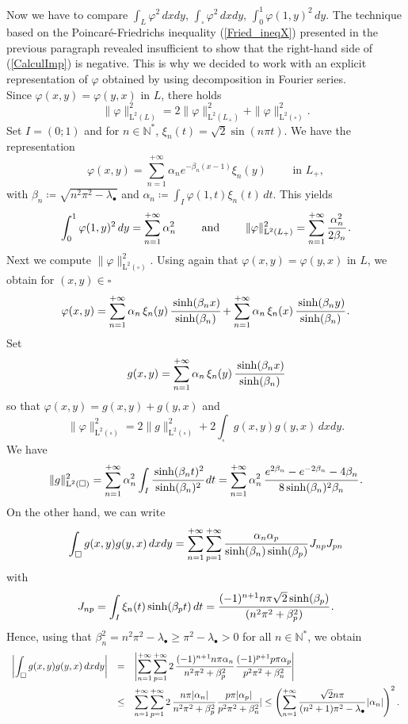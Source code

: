 \documentclass[11pt,a4paper]{article}
\newcommand{\dsp}{\displaystyle}
\newcommand{\mrm}[1]{\mathrm{#1}}
\newcommand{\N}{\mathbb{N}}
\newcommand{\mL}{\mrm{L}}
\newcommand{\GL}{L}
\begin{document}
Now we have to compare $\int_\GL\varphi^2\,dxdy$, $\int_{\square}\varphi^2\,dxdy$, $\int_0^1\varphi(1,y)^2\,dy$. The technique based on the Poincar\'e-Friedrichs inequality (\ref{Fried_ineqX}) presented in the previous paragraph revealed insufficient to show that the right-hand side of (\ref{CalculImp}) is negative. This is why we decided to work with an explicit representation of $\varphi$ obtained by using decomposition in Fourier series.\\
\newline
Since $\varphi(x,y)=\varphi(y,x)$ in $\GL$, there holds 
\begin{equation}\label{DecompoTermL2}
\|\varphi\|^2_{\mL^2(\GL)}=2\|\varphi\|^2_{\mL^2(\GL_+)}+\|\varphi\|^2_{\mL^2(\square)}.
\end{equation}
Set $I=(0;1)$ and for $n\in\N^\ast$, $\xi_n(t)=\sqrt{2}\sin(n\pi t)$. We have the representation
\[
\varphi(x,y)=\sum_{n=1}^{+\infty} \alpha_n e^{-\beta_n(x-1)}\xi_n(y)\qquad\mbox{ in }\GL_+, 
\] 
with $\beta_n\coloneqq\sqrt{n^2\pi^2-\lambda_\bullet}$ and $\alpha_n\coloneqq\int_I \varphi(1,t)\xi_n(t)\,dt$. This yields 
\[
\int_0^1\varphi(1,y)^2\,dy=\sum_{n=1}^{+\infty} \alpha^2_n \qquad\mbox{ and }\qquad \|\varphi\|^2_{\mL^2(\GL_+)} = \sum_{n=1}^{+\infty} \cfrac{\alpha^2_n }{2\beta_n}\,.
\]
Next we compute $\|\varphi\|^2_{\mL^2(\square)}$. Using again that $\varphi(x,y)=\varphi(y,x)$ in $\GL$, we obtain for $(x,y)\in\square$ 
\[
\varphi(x,y)=\sum_{n=1}^{+\infty} \alpha_n\,\xi_n(y)\,\cfrac{\sinh(\beta_nx)}{\sinh(\beta_n)}+\sum_{n=1}^{+\infty} \alpha_n\,\xi_n(x)\,\cfrac{\sinh(\beta_ny)}{\sinh(\beta_n)}\,.
\]
Set
\[
g(x,y)=\sum_{n=1}^{+\infty} \alpha_n\,\xi_n(y)\,\cfrac{\sinh(\beta_nx)}{\sinh(\beta_n)}
\]
so that $\varphi(x,y)=g(x,y)+g(y,x)$ and 
\[
\|\varphi\|^2_{\mL^2(\square)} =2\|g\|^2_{\mL^2(\square)}+2\int_{\square}g(x,y)g(y,x)\,dxdy.
\]
We have
\[
\|g\|^2_{\mL^2(\square)}=\sum_{n=1}^{+\infty} \alpha^2_n \int_I \cfrac{\sinh(\beta_nt)^2}{\sinh(\beta_n)^2}\,dt=\sum_{n=1}^{+\infty} \alpha^2_n \,\cfrac{e^{2\beta_n} - e^{-2\beta_n} - 4\beta_n}{8\sinh(\beta_n)^2\beta_n}\,.
\]
On the other hand, we can write
\[
\int_{\square}g(x,y)g(y,x)\,dxdy = \sum_{n=1}^{+\infty}\sum_{p=1}^{+\infty} \cfrac{\alpha_n\alpha_p}{\sinh(\beta_n)\sinh(\beta_p)}\,J_{np}J_{pn}
\]
with 
\[
J_{np}=\int_{I}\xi_n(t)\sinh(\beta_pt)\,dt=\cfrac{(-1)^{n+1}n\pi\sqrt{2}\sinh(\beta_p)}{(n^2\pi^2+\beta_p^2)}\,.
\]
Hence, using that $\beta_n^2=n^2\pi^2-\lambda_\bullet\ge\pi^2-\lambda_\bullet>0$ for all $n\in\N^\ast$, we obtain 
\[
\begin{array}{rcl}
\dsp\left|\int_{\square}g(x,y)g(y,x)\,dxdy\right| &=& \dsp\left|\sum_{n=1}^{+\infty}\sum_{p=1}^{+\infty} 2\,\cfrac{(-1)^{n+1}n\pi\alpha_n}{n^2\pi^2+\beta_p^2}\,\cfrac{(-1)^{p+1}p\pi\alpha_p}{p^2\pi^2+\beta_n^2}\right|\\[14pt]
& \le & \dsp\sum_{n=1}^{+\infty}\sum_{p=1}^{+\infty} 2\,\cfrac{n\pi|\alpha_n|}{n^2\pi^2+\beta_p^2}\,\cfrac{p\pi|\alpha_p|}{p^2\pi^2+\beta_n^2}|
\leq\left(\sum_{n=1}^{+\infty}\cfrac{\sqrt{2}n\pi}{(n^2+1)\pi^2-\lambda_\bullet}\,|\alpha_n|\right)^2.
\end{array}
\]
\end{document}
